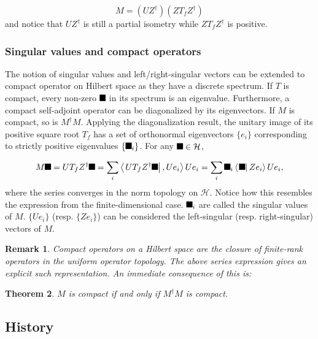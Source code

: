 \documentclass[aps,preprint]{revtex4}%
\providecommand{\U}[1]{\protect\rule{.1in}{.1in}}
\newtheorem{theorem}{Theorem}
\newtheorem{remark}[theorem]{Remark}
\begin{document}
\begin{equation}
M=\left(  UZ^{\dagger}\right)  \left(  ZT_{f}Z^{\dagger}\right)
\end{equation}
and notice that $UZ^{\dagger}$ is still a partial isometry while
$ZT_{f}Z^{\dagger}$ is positive.

\subsubsection{Singular values and compact operators}

The notion of singular values and left/right-singular vectors can be extended
to compact operator on Hilbert space as they have a discrete spectrum. If $T$
is compact, every non-zero $\U{3bb} $ in its spectrum is an eigenvalue.
Furthermore, a compact self-adjoint operator can be diagonalized by its
eigenvectors. If $M$ is compact, so is $M^{\dagger}M$. Applying the
diagonalization result, the unitary image of its positive square root $T_{f}$
has a set of orthonormal eigenvectors $\{e_{i}\}$ corresponding to strictly
positive eigenvalues $\{\U{3c3} _{i}\}$. For any $\U{3c8} \in\mathcal{H}$,%

\begin{equation}
M\U{3c8} =UT_{f}Z^{\dagger}\U{3c8} =\sum_{i}\left\langle \left.
UT_{f}Z^{\dagger}\U{3c8} \right\vert ,Ue_{i}\right\rangle Ue_{i}=\sum
_{i}\U{3c3} _{i}\left\langle \left.  \U{3c8} \right\vert Ze_{i}\right\rangle
Ue_{i},
\end{equation}
where the series converges in the norm topology on $\mathcal{H}$. Notice how
this resembles the expression from the finite-dimensional case. $\U{3c3} _{i}$
are called the singular values of $M$. $\{Ue_{i}\}$ (resp. $\{Ze_{i}\}$) can
be considered the left-singular (resp. right-singular) vectors of $M$.

\begin{remark}
Compact operators on a Hilbert space are the closure of finite-rank operators
in the uniform operator topology. The above series expression gives an
explicit such representation. An immediate consequence of this is:
\end{remark}

\begin{theorem}
$M$ is compact if and only if $M^{\dagger}M$ is compact.
\end{theorem}

\subsection{History}
\end{document}
